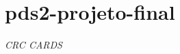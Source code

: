 \chapter{pds2-\/projeto-\/final}
\hypertarget{md__c_r_c}{}\label{md__c_r_c}
\label{md__c_r_c_autotoc_md0}%
%
 {\itshape CRC CARDS}













 